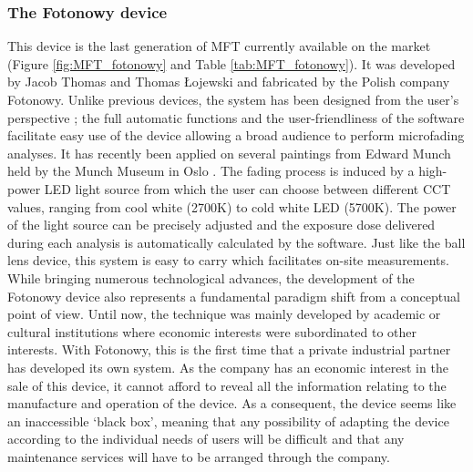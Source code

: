 \subsubsection{The Fotonowy device}

This device is the last generation of MFT currently available on the market (Figure \ref{fig:MFT_fotonowy} and Table \ref{tab:MFT_fotonowy}). It was developed by Jacob Thomas and Thomas \L ojewski and fabricated by the Polish company Fotonowy. Unlike previous devices, the system has been designed from the user's perspective ; the full automatic functions and the user-friendliness of the software facilitate easy use of the device allowing a broad audience to perform microfading analyses. It has recently been applied on several paintings from Edward Munch held by the Munch Museum in Oslo \citep{chan_microfade_2022}. The fading process is induced by a high-power LED light source from which the user can choose between different \gls{CCT} values, ranging from cool white (2700\unit{\kelvin}) to cold white LED (5700\unit{\kelvin}). The power of the light source can be precisely adjusted and the exposure dose delivered during each analysis is automatically calculated by the software. Just like the ball lens device, this system is easy to carry which facilitates on-site measurements. \\


While bringing numerous technological advances, the development of the Fotonowy device also represents a fundamental paradigm shift from a conceptual point of view. Until now, the technique was mainly developed by academic or cultural institutions where economic interests were subordinated to other interests. With Fotonowy, this is the first time that a private industrial partner has developed its own system. As the company has an economic interest in the sale of this device, it cannot afford to reveal all the information relating to the manufacture and operation of the device. As a consequent, the device seems like an inaccessible ‘black box’, meaning that any possibility of adapting the device according to the individual needs of users will be difficult and that any maintenance services will have to be arranged through the company. \\

